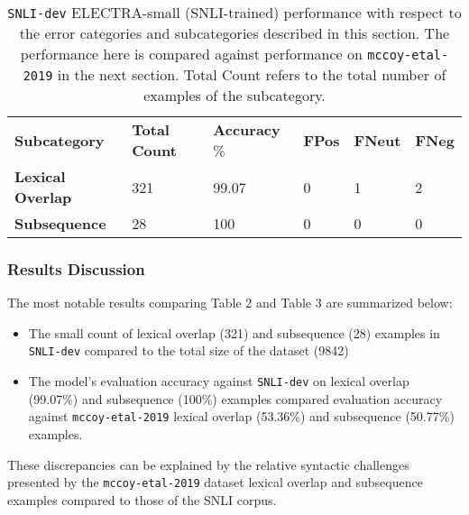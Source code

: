 \documentclass[11pt,a4paper]{article}
\begin{document}
\begin{table}[hbt!]
\begin{center}
\begin{tabular}
{p{}|p{} p{} p{} p{} p{} }
  \hline
  {\tiny \textbf{Subcategory}} & {\tiny \textbf{Total} \textbf{Count}} & {\tiny \textbf{Accuracy} {\%}} & {\tiny \textbf{FPos}} & {\tiny \textbf{FNeut}} & {\tiny \textbf{FNeg}} \\

  {\tiny \textbf{Lexical Overlap}} & {\tiny 321} & {\tiny 99.07} & {\tiny 0} & {\tiny 1} & {\tiny 2} \\

  {\tiny \textbf{Subsequence}} & {\tiny 28} & {\tiny 100} & {\tiny 0} & {\tiny 0} & {\tiny 0} \\

\end{tabular}
\end{center}
\caption{\texttt{SNLI-dev} ELECTRA-small (SNLI-trained) performance with respect to the error categories and subcategories described in this section. The performance here is compared against performance on \texttt{mccoy-etal-2019} in the next section. Total Count refers to the total number of examples of the subcategory.}
\end{table}

\subsubsection{Results Discussion}
\label{sec:rd}

The most notable results comparing Table 2 and Table 3 are summarized below:
\begin{itemize}
  \item The small count of lexical overlap (321) and subsequence (28) examples in \texttt{SNLI-dev} compared to the total size of the dataset (9842)
  \item The model's evaluation accuracy against \texttt{SNLI-dev} on lexical overlap (99.07\%) and subsequence (100\%) examples compared evaluation accuracy against \texttt{mccoy-etal-2019} lexical overlap (53.36\%) and subsequence (50.77\%) examples.
\end{itemize}
These discrepancies can be explained by the relative syntactic challenges presented by the \texttt{mccoy-etal-2019} dataset lexical overlap and subsequence examples compared to those of the SNLI corpus. 
\end{document}
